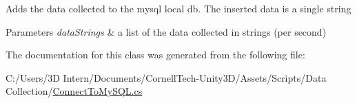 Adds the data collected to the mysql local db. The inserted data is a single string 


\begin{DoxyParams}{Parameters}
{\em data\+Strings} & a list of the data collected in strings (per second)\\
\hline
\end{DoxyParams}


The documentation for this class was generated from the following file\+:\begin{DoxyCompactItemize}
\item 
C\+:/\+Users/3\+D Intern/\+Documents/\+Cornell\+Tech-\/\+Unity3\+D/\+Assets/\+Scripts/\+Data Collection/\hyperlink{_connect_to_my_s_q_l_8cs}{Connect\+To\+My\+S\+Q\+L.\+cs}\end{DoxyCompactItemize}
